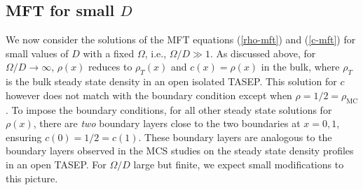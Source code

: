 \documentclass[aps,pre,twocolumn,superscriptaddress,amsmath,amssymb,longbibliography,floatfix,nofootinbib]{revtex4}
\begin{document}
{\subsection{MFT for small $D$}

We now consider the solutions of the MFT equations (\ref{rho-mft}) and (\ref{c-mft}) for small values of $D$ with a fixed $\Omega$, i.e., $\Omega/D\gg 1$. As discussed above, for $\Omega/D\rightarrow \infty$, $\rho(x)$ reduces to $\rho_{T}(x)$ and $c(x)=\rho(x)$ in the bulk, where $\rho_T$ is the bulk steady state density in an open isolated TASEP. This solution for $c$ however does not match with the boundary condition except when $\rho=1/2=\rho_\text{MC}$. To impose the boundary conditions, for all other steady state solutions for $\rho(x)$, there are {\em two} boundary layers close to the two boundaries at $x=0,1$, ensuring $c(0)=1/2=c(1)$. These boundary layers are analogous to the boundary layers observed in the MCS studies on the steady state density profiles in an open TASEP.  For $\Omega/D$ large but finite, we expect small modifications   to this picture. 

}
\end{document}
